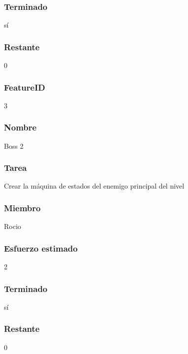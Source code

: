 \subsubsection{Terminado} sí
\subsubsection{Restante} 0

\subsubsection{FeatureID} 3
\subsubsection{Nombre} Boss 2
\subsubsection{Tarea} Crear la máquina de estados del enemigo principal del nivel
\subsubsection{Miembro} Rocio
\subsubsection{Esfuerzo estimado} 2
\subsubsection{Terminado} sí
\subsubsection{Restante} 0

